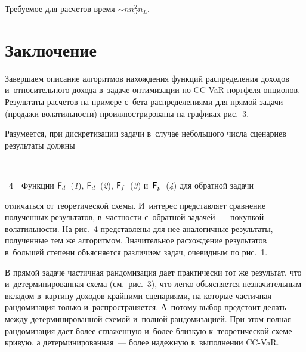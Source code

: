\begin{multicols}{2}
  Требуемое для расчетов время $\sim n n_J^2 n_L$. 
  
  \vspace*{-4pt}
  
  \section{Заключение}
  
    \vspace*{-4pt}
  
  Завершаем описание алгоритмов нахождения функций распределения 
доходов и~относительного дохода в~задаче оптимизации по CC-VaR портфеля 
опционов. Результаты расчетов на примере с~бе\-та-рас\-пре\-де\-ле\-ни\-ями 
для прямой задачи (продажи
 волатильности) проиллюстрированы на графиках 
рис.~3. 
  

  Разумеется, при дискретизации задачи в~случае небольшого числа сценариев 
результаты должны %

{ \begin{center}  %
 \vspace*{-4pt}
\mbox{%
 \epsfxsize=78.3mm 
 }


\end{center}


\noindent
{{\figurename~4}\ \ \small{Функции  ${\sf F}_d$~(\textit{1}),  ${\sf F}_d$~(\textit{2}),
${\sf F}_f$~(\textit{3}) и~${\sf F}_p$~(\textit{4}) для обратной задачи}}
}

\vspace*{12pt}

\addtocounter{figure}{1}


\noindent
 отличаться от теоретической схемы. И~интерес 
представляет сравнение полученных результатов, в~частности с~обратной 
задачей~--- покупкой волатильности. На рис.~4 представлены для нее 
аналогичные результаты, полученные тем же алгоритмом. Значительное 
расхождение результатов в~большей степени объясняется различием задач, 
очевидным по рис.~1.

  
  В прямой задаче частичная рандомизация дает практически тот же результат, 
что и~детерминированная схема (см.\ рис.~3), что легко объясняется 
незначительным вкладом в~картину доходов крайними сценариями, на которые 
частичная рандомизация только и~распространяется. А~потому выбор 
предстоит делать между детерминированной схемой и~полной рандомизацией. 
При этом полная рандомизация дает более сглаженную и~более близкую 
к~теоретической схеме кривую, а детерминированная~--- более надежную 
в~выполнении CC-VaR. 
  

\end{multicols}
